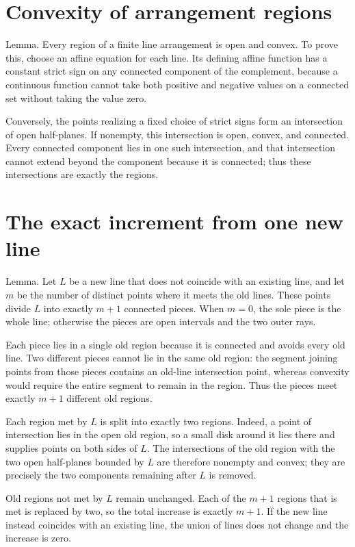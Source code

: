 \documentclass[11pt]{article}
\begin{document}
\section{Convexity of arrangement regions}
Lemma. Every region of a finite line arrangement is open and convex. To prove this, choose an affine equation for each line. Its defining affine function has a constant strict sign on any connected component of the complement, because a continuous function cannot take both positive and negative values on a connected set without taking the value zero.

Conversely, the points realizing a fixed choice of strict signs form an intersection of open half-planes. If nonempty, this intersection is open, convex, and connected. Every connected component lies in one such intersection, and that intersection cannot extend beyond the component because it is connected; thus these intersections are exactly the regions.

\section{The exact increment from one new line}
Lemma. Let $L$ be a new line that does not coincide with an existing line, and let $m$ be the number of distinct points where it meets the old lines. These points divide $L$ into exactly $m+1$ connected pieces. When $m=0$, the sole piece is the whole line; otherwise the pieces are open intervals and the two outer rays.

Each piece lies in a single old region because it is connected and avoids every old line. Two different pieces cannot lie in the same old region: the segment joining points from those pieces contains an old-line intersection point, whereas convexity would require the entire segment to remain in the region. Thus the pieces meet exactly $m+1$ different old regions.

Each region met by $L$ is split into exactly two regions. Indeed, a point of intersection lies in the open old region, so a small disk around it lies there and supplies points on both sides of $L$. The intersections of the old region with the two open half-planes bounded by $L$ are therefore nonempty and convex; they are precisely the two components remaining after $L$ is removed.

Old regions not met by $L$ remain unchanged. Each of the $m+1$ regions that is met is replaced by two, so the total increase is exactly $m+1$. If the new line instead coincides with an existing line, the union of lines does not change and the increase is zero.
\end{document}

